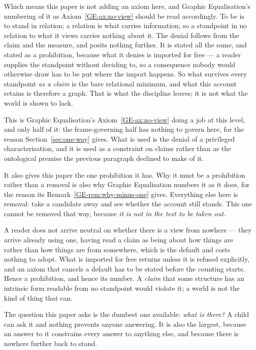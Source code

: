 \documentclass[11pt,a4paper]{article}
\begin{document}
Which means this paper is not adding an axiom here, and Graphic Equalisation's numbering of it as
Axiom~\ref{GE-ax:no-view} should be read accordingly. To be is to stand in relation; a relation is what carries
information; so a standpoint in no relation to what it views carries nothing about it. The denial
follows from the claim and the measure, and posits nothing further. It is stated all the same, and
stated as a prohibition, because what it denies is imported for free --- a reader supplies the
standpoint without deciding to, so a consequence nobody would otherwise draw has to be put where the
import happens. So what survives every standpoint \emph{as a claim} is the bare relational
minimum, and what this account retains is therefore a graph. That is what the discipline leaves; it is
not what the world is shown to lack.

This is Graphic Equalisation's Axiom~\ref{GE-ax:no-view} doing a job at this level, and only half of it: the frame-governing
half has nothing to govern here, for the reason Section~\ref{sec:one-way} gives. What is used is the
denial of a privileged characterisation, and it is used as a constraint on claims rather than as the
ontological premise the previous paragraph declined to make of it.

It also gives this paper the one prohibition it has. Why it must be a
prohibition rather than a removal is also why Graphic Equalisation numbers it as it does, for the
reason its Remark~\ref{GE-rem:why-minus-one} gives. Everything else here
is removal: take a candidate away and see whether the account still stands. This one cannot be removed that way, because \emph{it is not in the
text to be taken out}.

A reader does not arrive neutral on whether there is a view from nowhere --- they
arrive already using one, having read a claim as being about how things are rather than how things are
from somewhere, which is the default and costs nothing to adopt. What is imported for free returns
unless it is refused explicitly, and an axiom that cancels a default has to be stated before the
counting starts. Hence a prohibition, and hence its number. A \emph{claim} that some structure has an
intrinsic form readable from no standpoint would violate it; a world is not the kind of thing that
can.

The question this paper asks is the dumbest one available: \emph{what is there?} A child can ask it and
nothing prevents anyone answering. It is also the largest, because an answer to it constrains every
answer to anything else, and because there is nowhere further back to stand.
\end{document}

